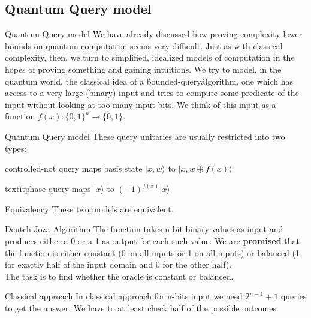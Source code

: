     \subsection{Quantum Query model}
    \begin{frame}{Quantum Query model}
        We have already discussed how proving complexity lower bounds on quantum 
        computation seems very difficult. Just as with classical complexity, then, we turn to simplified, 
        idealized models of computation in the hopes of proving something and gaining intuitions. 
        We try to model, in the quantum world, the classical idea of a \'bounded-query\' algorithm, 
        one which has access to a very large (binary) input and tries to compute some predicate of the input 
        without looking at too many input bits. We think of this input as a function $f(x): \{0,1\}^n \rightarrow \{0,1\}$.
    \end{frame}
    \begin{frame}{Quantum Query model}
        These query unitaries are usually restricted into two types:
        \begin{block}{controlled-not query}
            maps basis state $|x,w\rangle$ to $|x,w \oplus f(x) \rangle$
        \end{block}
        \begin{block}{textitphase query}
            maps $|x\rangle$ to $(-1)^{f(x)}|x\rangle$
        \end{block}
        \begin{block}{Equivalency}
            These two models are equivalent.
        \end{block}
    \end{frame}
    \begin{frame}{Deutch-Joza Algorithm}
        The function takes n-bit binary values as input and produces either 
        a 0 or a 1 as output for each such value. We are \textbf{promised} that the function 
        is either constant (0 on all inputs or 1 on all inputs) 
        or balanced (1 for exactly half of the input domain and 0 for the other half).\\
        The task is to find whether the oracle is constant or balanced.
        \begin{block}{Classical approach}
            In classical approach for n-bits input we need $2^{n-1} + 1$ queries to get the answer.
            We have to at least check half of the possible outcomes.
        \end{block}
    \end{frame}
